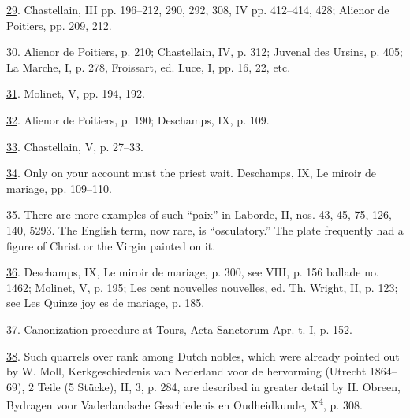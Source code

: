 \protect\hypertarget{23_NOTES.xhtmlux5cux23id_2030}{\protect\hyperlink{09_Chapter_Two__THE_CRAVING_FOR_A_M.xhtmlux5cux23id_2029}{29}}.
Chastellain, III pp. 196--212, 290, 292, 308, IV pp. 412--414, 428;
Alienor de Poitiers, pp. 209, 212.

\protect\hypertarget{23_NOTES.xhtmlux5cux23id_2028}{\protect\hyperlink{09_Chapter_Two__THE_CRAVING_FOR_A_M.xhtmlux5cux23id_2027}{30}}.
Alienor de Poitiers, p. 210; Chastellain, IV, p. 312; Juvenal des
Ursins, p. 405; La Marche, I, p. 278, Froissart, ed. Luce, I, pp. 16,
22, etc.

\protect\hypertarget{23_NOTES.xhtmlux5cux23id_2026}{\protect\hyperlink{09_Chapter_Two__THE_CRAVING_FOR_A_M.xhtmlux5cux23id_2025}{31}}.
Molinet, V, pp. 194, 192.

\protect\hypertarget{23_NOTES.xhtmlux5cux23id_2024}{\protect\hyperlink{09_Chapter_Two__THE_CRAVING_FOR_A_M.xhtmlux5cux23id_2023}{32}}.
Alienor de Poitiers, p. 190; Deschamps, IX, p. 109.

\protect\hypertarget{23_NOTES.xhtmlux5cux23id_2022}{\protect\hyperlink{09_Chapter_Two__THE_CRAVING_FOR_A_M.xhtmlux5cux23id_2021}{33}}.
Chastellain, V, p. 27--33.

\protect\hypertarget{23_NOTES.xhtmlux5cux23id_2020}{\protect\hyperlink{09_Chapter_Two__THE_CRAVING_FOR_A_M.xhtmlux5cux23id_2019}{34}}.
Only on your account must the priest wait. Deschamps, IX, Le miroir de
mariage, pp. 109--110.

\protect\hypertarget{23_NOTES.xhtmlux5cux23id_2018}{\protect\hyperlink{09_Chapter_Two__THE_CRAVING_FOR_A_M.xhtmlux5cux23id_2017}{35}}.
There are more examples of such ``paix'' in Laborde, II, nos. 43, 45,
75, 126, 140, 5293. The English term, now rare, is ``osculatory.'' The
plate frequently had a figure of Christ or the Virgin painted on it.

\protect\hypertarget{23_NOTES.xhtmlux5cux23id_2016}{\protect\hyperlink{09_Chapter_Two__THE_CRAVING_FOR_A_M.xhtmlux5cux23id_2015}{36}}.
Deschamps, IX, Le miroir de mariage, p. 300, see VIII, p. 156 ballade
no. 1462; Molinet, V, p. 195; Les cent nouvelles nouvelles, ed. Th.
Wright, II, p. 123; see Les Quinze joy es de mariage, p. 185.

\protect\hypertarget{23_NOTES.xhtmlux5cux23id_2014}{\protect\hyperlink{09_Chapter_Two__THE_CRAVING_FOR_A_M.xhtmlux5cux23id_2013}{37}}.
Canonization procedure at Tours, Acta Sanctorum Apr. t. I, p. 152.

\protect\hypertarget{23_NOTES.xhtmlux5cux23id_2012}{\protect\hyperlink{09_Chapter_Two__THE_CRAVING_FOR_A_M.xhtmlux5cux23id_2011}{38}}.
Such quarrels over rank among Dutch nobles, which were already pointed
out by W. Moll, Kerkgeschiedenis van Nederland voor de hervorming
(Utrecht 1864--69), 2 Teile (5 Stücke), II, 3, p. 284, are described in
greater detail by H. Obreen, Bydragen voor Vaderlandsche Geschiedenis en
Oudheidkunde, X\textsuperscript{4}, p. 308.

